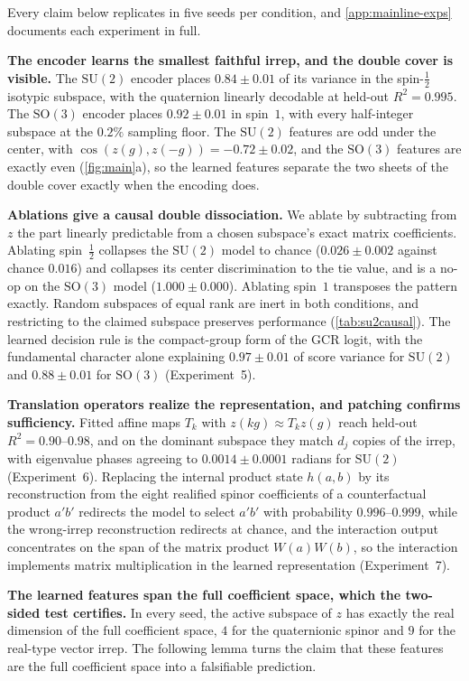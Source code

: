 \documentclass{article}
\newcommand{\SU}{\mathrm{SU}}
\newcommand{\SO}{\mathrm{SO}}
\begin{document}
Every claim below replicates in five seeds per condition, and
\cref{app:mainline-exps} documents each experiment in full.

\textbf{The encoder learns the smallest faithful irrep, and the double
cover is visible.} The $\SU(2)$ encoder places $0.84 \pm 0.01$ of its variance in the
spin-$\tfrac12$ isotypic subspace, with the quaternion linearly
decodable at held-out $R^2 = 0.995$. The $\SO(3)$ encoder places $0.92 \pm 0.01$ in spin~$1$, with every
half-integer subspace at the $0.2\%$ sampling floor. The $\SU(2)$ features are odd under the center, with $\cos(z(g), z(-g))
= -0.72 \pm 0.02$, and the $\SO(3)$ features are exactly even
(\cref{fig:main}a), so the learned features separate the two sheets of
the double cover exactly when the encoding does.

\textbf{Ablations give a causal double dissociation.} We ablate by
subtracting from $z$ the part linearly predictable from a chosen
subspace's exact matrix coefficients. Ablating spin~$\tfrac12$ collapses
the $\SU(2)$ model to chance ($0.026 \pm 0.002$ against chance $0.016$)
and collapses its center discrimination to the tie value, and is a
no-op on the $\SO(3)$ model ($1.000 \pm 0.000$). Ablating spin~$1$
transposes the pattern exactly. Random subspaces of equal rank are inert in both conditions, and
restricting to the claimed subspace preserves performance
(\cref{tab:su2causal}). The learned decision rule is the compact-group
form of the GCR logit, with the fundamental character alone explaining
$0.97 \pm 0.01$ of score variance for $\SU(2)$ and $0.88 \pm 0.01$ for
$\SO(3)$ (Experiment~5).

\textbf{Translation operators realize the representation, and patching
confirms sufficiency.} Fitted affine maps $T_k$ with $z(kg) \approx T_k z(g)$ reach held-out
$R^2 = 0.90$--$0.98$, and on the dominant subspace they match $d_j$
copies of the irrep, with eigenvalue phases agreeing to $0.0014 \pm
0.0001$ radians for $\SU(2)$ (Experiment~6). Replacing the internal
product state $h(a,b)$ by its reconstruction from the eight realified
spinor coefficients of a counterfactual product $a'b'$ redirects the
model to select $a'b'$ with probability $0.996$--$0.999$, while the wrong-irrep reconstruction redirects at chance, and the
interaction output concentrates on the span of the matrix product
$W(a)W(b)$, so the interaction implements matrix multiplication in the
learned representation (Experiment~7).

\textbf{The learned features span the full coefficient space, which the
two-sided test certifies.} In every seed, the active subspace of $z$
has exactly the real dimension of the full coefficient space, $4$ for
the quaternionic spinor and $9$ for the real-type vector irrep. The following lemma turns the claim that these features are the full
coefficient space into a falsifiable prediction.
\end{document}
